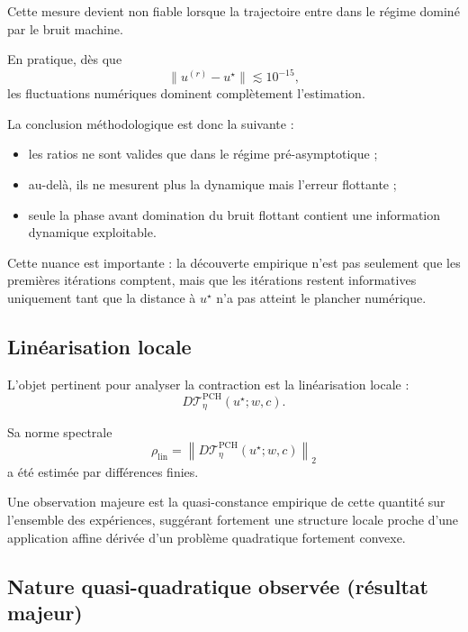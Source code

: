 \documentclass[11pt,a4paper]{article}
\newcommand{\1}{\mathbf 1}
\begin{document}
Cette mesure devient non fiable lorsque la trajectoire entre dans le régime dominé par le bruit machine.

En pratique, dès que
\[
\|u^{(r)}-u^\star\| \lesssim 10^{-15},
\]
les fluctuations numériques dominent complètement l’estimation.

La conclusion méthodologique est donc la suivante :

\begin{itemize}[leftmargin=2em]
\item les ratios ne sont valides que dans le régime pré-asymptotique ;
\item au-delà, ils ne mesurent plus la dynamique mais l’erreur flottante ;
\item seule la phase avant domination du bruit flottant contient une information dynamique exploitable.
\end{itemize}

Cette nuance est importante : la découverte empirique n’est pas seulement que les premières itérations comptent, mais que les itérations restent informatives uniquement tant que la distance à \(u^\star\) n’a pas atteint le plancher numérique.

\subsection{Linéarisation locale}

L’objet pertinent pour analyser la contraction est la linéarisation locale :
\[
D\mathcal T_\eta^{\mathrm{PCH}}(u^\star;w,c).
\]

Sa norme spectrale
\[
\rho_{\mathrm{lin}}
=
\left\|D\mathcal T_\eta^{\mathrm{PCH}}(u^\star;w,c)\right\|_2
\]
a été estimée par différences finies.

Une observation majeure est la quasi-constance empirique de cette quantité sur l’ensemble des expériences, suggérant fortement une structure locale proche d’une application affine dérivée d’un problème quadratique fortement convexe.

\subsection{Nature quasi-quadratique observée (résultat majeur)}
\end{document}

